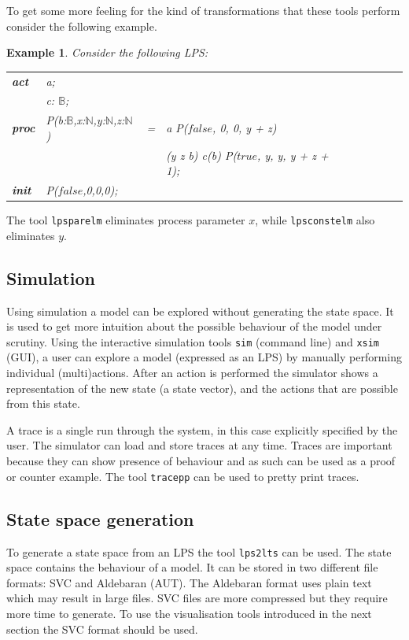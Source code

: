 \documentclass[a4paper,fleqn]{article}
\makeatletter
\newtheorem{thexample}[thdefinition]{Example}
\newenvironment{example}
  {\begin{thexample}\em}
  {\end{thexample}}
\newcommand{\f}[1]{\ensuremath{\mathit{#1}}}
\newcommand{\bool}{\ensuremath{\mathbb{B}}}
\newcommand{\true}{\ensuremath{\f{true}}}
\newcommand{\false}{\ensuremath{\f{false}}}
\newcommand{\nat}{\ensuremath{\mathbb{N}}}
\newcommand{\seq}{\mathbin{\cdot}}
\newcommand{\alt}{\mathbin{+}}
\newcommand{\ap}{{:}}
\newenvironment{mcrl2}%
{\par\bigskip\noindent%
 \begin{tabular}{@{}>{\bf}p{2.3em}L@{\ }L@{\ }L@{\ }L@{\ }L@{\ }L@{\ }L@{\ }L}%
}%
{\end{tabular}\bigskip\par%
}
\makeatother
\begin{document}
To get some more feeling for the kind of transformations that these tools
perform consider the following example.
\begin{example}
Consider the following LPS:
\begin{mcrl2}
act  & a;\\
     & c: \bool;\\
proc & P(b\ap\bool,x\ap\nat,y\ap\nat,z\ap\nat)
       &    = & a {\seq} P(\false, 0, 0, y + z)\\
     & & \alt & (y \not\approx z \lor \neg b) \to c(b) {\seq} P(\true, y, y, y + z + 1);\\
init & P(\false,0,0,0);
\end{mcrl2}
\end{example}
The tool \texttt{lpsparelm} eliminates process parameter $x$, while \texttt{lpsconstelm}
also eliminates $y$.

\subsection{Simulation}

Using simulation a model can be explored without generating the state space.
It is used to get more intuition about the possible behaviour of the model
under scrutiny.  Using the interactive simulation tools \texttt{sim} (command
line) and \texttt{xsim} (GUI), a user can explore a model (expressed as an LPS)
by manually performing individual (multi)actions. After an action is performed
the simulator shows a representation of the new state (a state vector), and the
actions that are possible from this state.

A trace is a single run through the system, in this case explicitly specified
by the user.  The simulator can load and store traces at any time. Traces are
important because they can show presence of behaviour and as such can be used
as a proof or counter example. The tool \texttt{tracepp} can be used to pretty
print traces.

\subsection{State space generation}

To generate a state space from an LPS the tool \texttt{lps2lts} can be used.
The state space contains the behaviour of a model.  It can be stored in two
different file formats: SVC and Aldebaran (AUT).  The Aldebaran format uses
plain text which may result in large files. SVC files are more compressed but
they require more time to generate. To use the visualisation tools introduced
in the next section the SVC format should be used.
\end{document}
